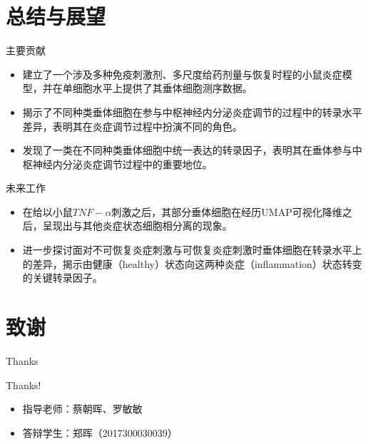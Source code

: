 \documentclass{beamer}
\begin{document}
\section{总结与展望}

\begin{frame}{主要贡献}
  \begin{itemize}
    \item 建立了一个涉及多种免疫刺激剂、多尺度给药剂量与恢复时程的小鼠炎症模型，并在单细胞水平上提供了其垂体细胞测序数据。
    \item 揭示了不同种类垂体细胞在参与中枢神经内分泌炎症调节的过程中的转录水平差异，表明其在炎症调节过程中扮演不同的角色。
    \item 发现了一类在不同种类垂体细胞中统一表达的转录因子，表明其在垂体参与中枢神经内分泌炎症调节过程中的重要地位。
  \end{itemize}
\end{frame}

\begin{frame}{未来工作}
  \begin{itemize}
    \item 在给以小鼠$TNF-\alpha$刺激之后，其部分垂体细胞在经历UMAP可视化降维之后，呈现出与其他炎症状态细胞相分离的现象。
    \item 进一步探讨面对不可恢复炎症刺激与可恢复炎症刺激时垂体细胞在转录水平上的差异，揭示由健康（healthy）状态向这两种炎症（inflammation）状态转变的关键转录因子。
  \end{itemize}
\end{frame}

\section{致谢}

\begin{frame}{Thanks}
  \begin{center}
    {\Huge Thanks!}
  \end{center}
  \begin{itemize}
    \item 指导老师：蔡朝晖、罗敏敏
    \item 答辩学生：郑晖（2017300030039）
  \end{itemize}
\end{frame}
\end{document}
